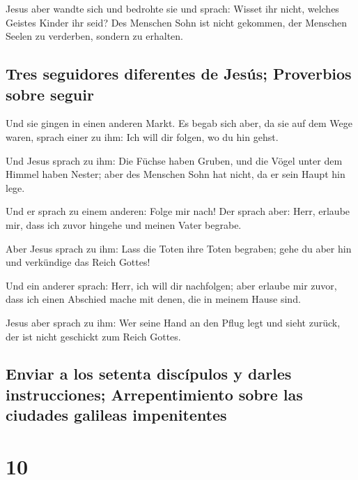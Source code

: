  Jesus aber wandte sich und bedrohte sie und sprach:
Wisset ihr nicht, welches Geistes Kinder ihr seid?  Des
Menschen Sohn ist nicht gekommen, der Menschen Seelen zu verderben,
sondern zu erhalten.

\hypertarget{tres-seguidores-diferentes-de-jesuxfas-proverbios-sobre-seguir}{%
\subsection{Tres seguidores diferentes de Jesús; Proverbios sobre
seguir}\label{tres-seguidores-diferentes-de-jesuxfas-proverbios-sobre-seguir}}

 Und sie gingen in einen anderen Markt. Es begab sich
aber, da sie auf dem Wege waren, sprach einer zu ihm: Ich will dir
folgen, wo du hin gehst.

 Und Jesus sprach zu ihm: Die Füchse haben Gruben, und
die Vögel unter dem Himmel haben Nester; aber des Menschen Sohn hat
nicht, da er sein Haupt hin lege.

 Und er sprach zu einem anderen: Folge mir nach! Der
sprach aber: Herr, erlaube mir, dass ich zuvor hingehe und meinen Vater
begrabe.

 Aber Jesus sprach zu ihm: Lass die Toten ihre Toten
begraben; gehe du aber hin und verkündige das Reich Gottes!

 Und ein anderer sprach: Herr, ich will dir nachfolgen;
aber erlaube mir zuvor, dass ich einen Abschied mache mit denen, die in
meinem Hause sind.

 Jesus aber sprach zu ihm: Wer seine Hand an den Pflug
legt und sieht zurück, der ist nicht geschickt zum Reich Gottes.

\hypertarget{enviar-a-los-setenta-discuxedpulos-y-darles-instrucciones-arrepentimiento-sobre-las-ciudades-galileas-impenitentes}{%
\subsection{Enviar a los setenta discípulos y darles instrucciones;
Arrepentimiento sobre las ciudades galileas
impenitentes}\label{enviar-a-los-setenta-discuxedpulos-y-darles-instrucciones-arrepentimiento-sobre-las-ciudades-galileas-impenitentes}}

\hypertarget{section-9}{%
\section{10}\label{section-9}}

